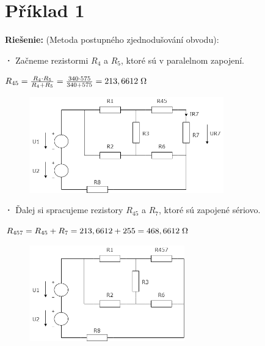 \section{Příklad 1}

\begin{large}
\textbf{Riešenie:} (Metoda postupného zjednodušování obvodu):\\
\end{large}

\textbf{·}
Začneme rezistormi $R_4$ a $R_5$, ktoré sú v paralelnom zapojení.

\begin{center}
$R_{45} = \frac{R_4\cdot{R_5}}{R_4 + R_5} = \frac{340\cdot 575}{340 + 575} = {213,6612} \hspace{0,1cm} \SI{}{\ohm}$\\
\end{center}

\begin{figure}[h!]
    \centering
    \includegraphics[width=0.75\textwidth]{IEL-Project/pictures/Pr1_1.png}
\end{figure}

\textbf{·}
Ďalej si spracujeme rezistory $R_{45}$ a $R_7$, ktoré sú zapojené sériovo.

\begin{center}
$R_{457} = R_{45} + R_7 = 213,6612 + 255 = 468,6612 \hspace{0,1cm} \SI{}{\ohm}$\\
\end{center}

\begin{figure}[h!]
    \centering
    \includegraphics[width=0.6\textwidth]{IEL-Project/pictures/Pr1_2.png}
\end{figure}

